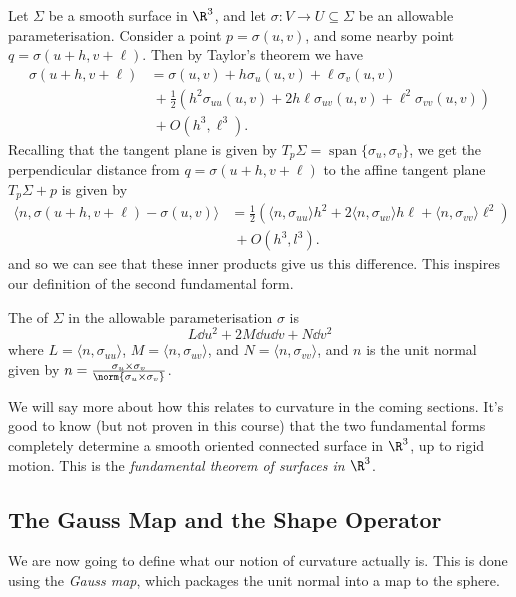 Let $\Sigma$ be a smooth surface in $\R^3$, and let $\sigma: V \rightarrow U \subseteq \Sigma$ be an allowable parameterisation. Consider a point $p = \sigma(u, v)$, and some nearby point $q = \sigma(u + h, v + \ell)$. Then by Taylor's theorem we have
\begin{align*}
\sigma(u + h, v + \ell) &= \sigma(u, v) + h \sigma_u(u, v) + \ell \sigma_v(u, v) \\
&\ + \frac{1}{2}\left(h^2 \sigma_{uu}(u, v) + 2 h\ell \sigma_{uv}(u, v) + \ell^2 \sigma_{vv}(u, v)\right)\\&\ + O(h^3, \ell^3).
\end{align*}
Recalling that the tangent plane is given by $T_p\Sigma = \operatorname{span}\{\sigma_u, \sigma_v\}$, we get the perpendicular distance from $q = \sigma(u + h, v+\ell)$ to the affine tangent plane $T_p\Sigma + p$ is given by
\begin{align*}
    \langle n, \sigma(u + h, v + \ell) - \sigma(u, v)\rangle &= \frac{1}{2}\left(\langle n, \sigma_{uu} \rangle h^2 + 2 \langle n, \sigma_{uv}\rangle h \ell + \langle n, \sigma_{vv} \rangle \ell^2\right)\\&\  + O(h^3, l^3). 
\end{align*}
and so we can see that these inner products give us this difference. This inspires our definition of the second fundamental form.

\begin{definition}
    The  of $\Sigma$ in the allowable parameterisation $\sigma$ is
    $$
    L \dd u^2 + 2M \dd u \dd v + N \dd v^2
    $$
    where $L = \langle n, \sigma_{uu} \rangle$, $M =  \langle n, \sigma_{uv} \rangle$, and $N = \langle n, \sigma_{vv} \rangle$, and $n$ is the unit normal given by $n = \frac{\sigma_u \times \sigma_v}{\norm{\sigma_u \times \sigma_v}}$.
\end{definition}

We will say more about how this relates to curvature in the coming sections. It's good to know (but not proven in this course) that the two fundamental forms completely determine a smooth oriented connected surface in $\R^3$, up to rigid motion. This is the \emph{fundamental theorem of surfaces in $\R^3$}.

\subsection{The Gauss Map and the Shape Operator}

We are now going to define what our notion of curvature actually is. This is done using the \emph{Gauss map}, which packages the unit normal into a map to the sphere.

